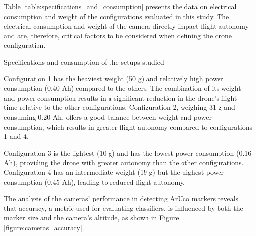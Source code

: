 \documentclass[letterpaper]{article}
\begin{document}
Table \ref{table:specifications_and_consumption} presents the data on electrical consumption and weight of the configurations evaluated in this study. The electrical consumption and weight of the camera directly impact flight autonomy and are, therefore, critical factors to be considered when defining the drone configuration.

\begin{table}[H]
\begin{center}
\caption{Specifications and consumption of the setups studied}
\label{table:specifications_and_consumption}
\captionsetup{font=footnotesize,skip=0pt}
\caption*{CAM = camera, V = voltage (V), C = current (Ah), W = weight (g).}
\end{center}
\end{table}


Configuration 1 has the heaviest weight (50 g) and relatively high power consumption (0.40 Ah) compared to the others. The combination of its weight and power consumption results in a significant reduction in the drone's flight time relative to the other configurations. Configuration 2, weighing 31 g and consuming 0.20 Ah, offers a good balance between weight and power consumption, which results in greater flight autonomy compared to configurations 1 and 4.

Configuration 3 is the lightest (10 g) and has the lowest power consumption (0.16 Ah), providing the drone with greater autonomy than the other configurations. Configuration 4 has an intermediate weight (19 g) but the highest power consumption (0.45 Ah), leading to reduced flight autonomy.

The analysis of the cameras' performance in detecting ArUco markers reveals that accuracy, a metric used for evaluating classifiers, is influenced by both the marker size and the camera's altitude, as shown in Figure \ref{figure:cameras_accuracy}.
\end{document}

